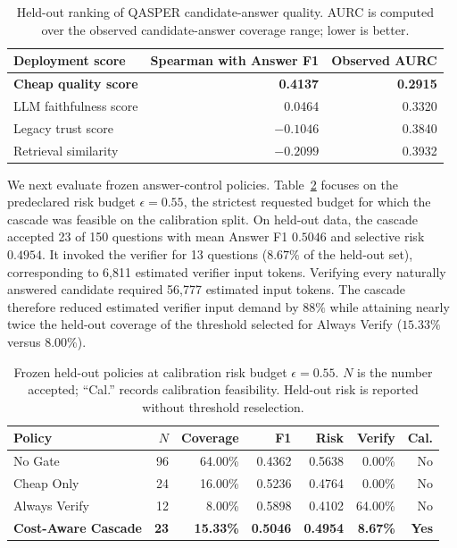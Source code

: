 \documentclass[smallextended]{svjour3}
\begin{document}
\begin{table}[htbp]
\centering
\caption{Held-out ranking of QASPER candidate-answer quality. AURC is computed over the observed candidate-answer coverage range; lower is better.}
\label{tab:qasper_ranking}
\renewcommand{\arraystretch}{1.12}
\small
\begin{tabular}{@{}lrr@{}}
\toprule
\textbf{Deployment score} & \textbf{Spearman with Answer F1} & \textbf{Observed AURC} \\
\midrule
\rowcolor{gray!10}
\textbf{Cheap quality score} & \textbf{0.4137} & \textbf{0.2915} \\
LLM faithfulness score & 0.0464 & 0.3320 \\
Legacy trust score & $-0.1046$ & 0.3840 \\
Retrieval similarity & $-0.2099$ & 0.3932 \\
\bottomrule
\end{tabular}
\end{table}

We next evaluate frozen answer-control policies. Table~\ref{tab:qasper_cost_policy} focuses on the predeclared risk budget $\epsilon=0.55$, the strictest requested budget for which the cascade was feasible on the calibration split. On held-out data, the cascade accepted 23 of 150 questions with mean Answer F1 $0.5046$ and selective risk $0.4954$. It invoked the verifier for 13 questions ($8.67\%$ of the held-out set), corresponding to 6,811 estimated verifier input tokens. Verifying every naturally answered candidate required 56,777 estimated input tokens. The cascade therefore reduced estimated verifier input demand by $88\%$ while attaining nearly twice the held-out coverage of the threshold selected for Always Verify ($15.33\%$ versus $8.00\%$).

\begin{table}[htbp]
\centering
\caption{Frozen held-out policies at calibration risk budget $\epsilon=0.55$. $N$ is the number accepted; ``Cal.'' records calibration feasibility. Held-out risk is reported without threshold reselection.}
\label{tab:qasper_cost_policy}
\renewcommand{\arraystretch}{1.12}
\scriptsize
\setlength{\tabcolsep}{2.2pt}
\begin{tabular}{@{}lrrrrrr@{}}
\toprule
\textbf{Policy} & \textbf{$N$} & \textbf{Coverage} & \textbf{F1} & \textbf{Risk} & \textbf{Verify} & \textbf{Cal.} \\
\midrule
No Gate & 96 & 64.00\% & 0.4362 & 0.5638 & 0.00\% & No \\
Cheap Only & 24 & 16.00\% & 0.5236 & 0.4764 & 0.00\% & No \\
Always Verify & 12 & 8.00\% & 0.5898 & 0.4102 & 64.00\% & No \\
\rowcolor{gray!10}
\textbf{Cost-Aware Cascade} & \textbf{23} & \textbf{15.33\%} & \textbf{0.5046} & \textbf{0.4954} & \textbf{8.67\%} & \textbf{Yes} \\
\bottomrule
\end{tabular}
\end{table}
\end{document}
